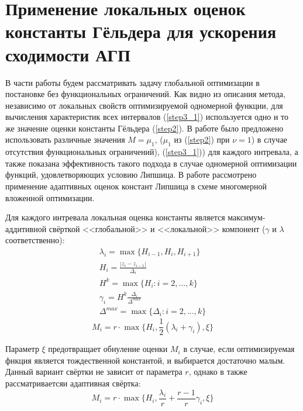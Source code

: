 \section{Применение локальных оценок константы Гёльдера для ускорения сходимости АГП}
В части работы будем рассматривать задачу глобальной оптимизации в постановке без функциональных ограничений.
Как видно из описания метода, независимо от локальных свойств оптимизируемой одномерной
функции, для вычисления характеристик всех интервалов (\ref{step3_1}) используется одно и то же
значение оценки константы Гёльдера (\ref{step2}). В работе \cite{sergLocalTuningFirst} было предложено использовать различные
значения \(M=\mu_1\), (\(\mu_1\) из (\ref{step2}) при \(\nu=1\)) в случае отсутствия функциональных ограничений), (\ref{step3_1})) для каждого интревала, а
также показана эффективность такого подхода в случае одномерной оптимизации функций,
удовлетворяющих условию Липшица. В работе \cite{nestedLocal} рассмотрено применение
адаптивных оценок констант Липшица в схеме многомерной вложенной оптимизации.

Для каждого интревала локальная оценка константы является максимум-аддитивной свёрткой
<<глобальной>> и <<локальной>> компонент (\(\gamma\) и \(\lambda\) соответственно):
\begin{displaymath}
  \begin{array}{lr}
    \lambda_i=\max\{H_{i-1},H_i,H_{i+1}\} \\
    H_i=\frac{|z_i-z_{i-1}|}{\Delta_i} \\
    H^k=\max\{H_i:i=2,\dots ,k\} \\
    \gamma_i=H^k\frac{\Delta_i}{\Delta^{max}} \\
    \Delta^{max}=\max\{\Delta_{i}:i=2,\dots ,k\}
  \end{array}
\end{displaymath}
\begin{equation}
\label{additiveConv}
M_i=r\cdot \max\{H_i, \frac{1}{2}(\lambda_i+\gamma_i),\xi\}
\end{equation}

Параметр \(\xi\) предотвращает обнуление оценки \(M_i\) в случае, если оптимизируемая
фнкция является тождественной константой, и выбирается достаточно малым.
Данный вариант свёртки не зависит от параметра \(r\), однако в \cite{sergLocalTuning}
также рассматриваетсяи адаптивная свёртка:
\begin{equation}
\label{additiveAdaptiveConv}
M_i=r\cdot \max\{H_i, \frac{\lambda_i}{r}+\frac{r-1}{r}\gamma_i,\xi\}
\end{equation}

